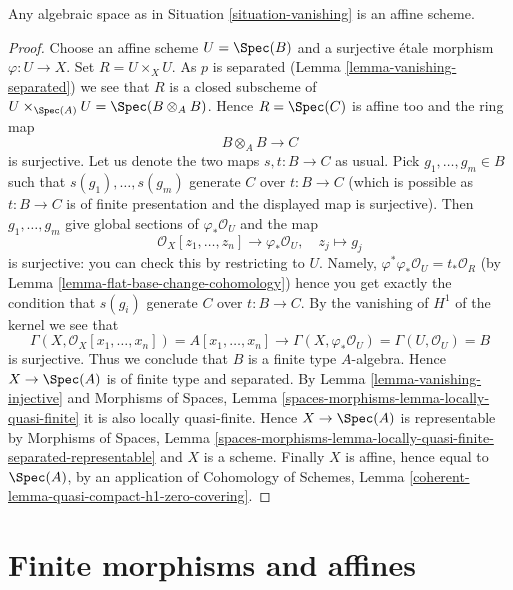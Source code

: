 \begin{proposition}
\label{proposition-vanishing-affine}
Any algebraic space as in Situation \ref{situation-vanishing} is an
affine scheme.
\end{proposition}

\begin{proof}
Choose an affine scheme $U = \Spec(B)$ and a surjective \'etale
morphism $\varphi : U \to X$. Set $R = U \times_X U$. As $p$ is separated
(Lemma \ref{lemma-vanishing-separated}) we see that $R$ is a
closed subscheme of $U \times_{\Spec(A)} U = \Spec(B \otimes_A B)$.
Hence $R = \Spec(C)$ is affine too and the ring map
$$
B \otimes_A B \longrightarrow C
$$
is surjective. Let us denote the two maps $s, t : B \to C$ as usual. Pick
$g_1, \ldots, g_m \in B$ such that $s(g_1), \ldots, s(g_m)$ generate $C$
over $t : B \to C$ (which is possible as $t : B \to C$ is of finite
presentation and the displayed map is surjective). Then $g_1, \ldots, g_m$
give global sections of $\varphi_*\mathcal{O}_U$ and the map
$$
\mathcal{O}_X[z_1, \ldots, z_n] \longrightarrow \varphi_*\mathcal{O}_U,
\quad
z_j \longmapsto g_j
$$
is surjective: you can check this by restricting to $U$.
Namely, $\varphi^*\varphi_*\mathcal{O}_U = t_*\mathcal{O}_R$
(by Lemma \ref{lemma-flat-base-change-cohomology})
hence you get exactly the condition that $s(g_i)$ generate $C$
over $t : B \to C$. By the vanishing of $H^1$ of the kernel we see that
$$
\Gamma(X, \mathcal{O}_X[x_1, \ldots, x_n]) =
A[x_1, \ldots, x_n] \longrightarrow
\Gamma(X, \varphi_*\mathcal{O}_U) = \Gamma(U, \mathcal{O}_U) = B
$$
is surjective. Thus we conclude that $B$ is a finite type $A$-algebra.
Hence $X \to \Spec(A)$ is of finite type and separated.
By Lemma \ref{lemma-vanishing-injective}
and
Morphisms of Spaces, Lemma \ref{spaces-morphisms-lemma-locally-quasi-finite}
it is also locally quasi-finite. Hence $X \to \Spec(A)$ is representable by
Morphisms of Spaces, Lemma
\ref{spaces-morphisms-lemma-locally-quasi-finite-separated-representable}
and $X$ is a scheme. Finally $X$ is affine, hence equal to $\Spec(A)$,
by an application of Cohomology of Schemes, Lemma
\ref{coherent-lemma-quasi-compact-h1-zero-covering}.
\end{proof}








\section{Finite morphisms and affines}
\label{section-finite-affine}

